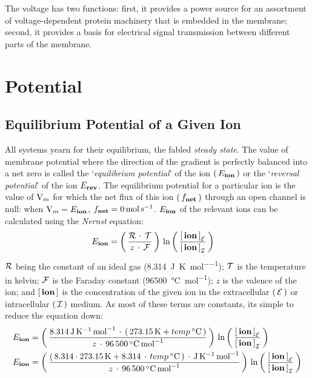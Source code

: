 \documentclass[../../Orator]{subfiles}
\begin{document}
The voltage has two functions: first, it provides a power source for an assortment of voltage-dependent protein machinery that is embedded in the membrane; second, it provides a basis for electrical signal transmission between different parts of the membrane.



\section{Potential}
\subsection{Equilibrium Potential of a Given Ion}
All systems yearn for their equilibrium, the fabled \textit{steady state}. 
The value of membrane potential 
where the direction of the gradient is perfectly balanced into a net zero is  
called the `\textit{equilibrium potential}' of the ion \(\left(\,E_{\mathbf{ion}}\,\right)\) or the `\textit{reversal potential}' of the ion \(E_{\mathbf{rev}}\). The equilibrium potential for a particular 
ion is the value of \(\mathrm{V}_m\) for which the net flux of this ion \(\left(\,f_{\mathbf{net}}\,\right)\) through an open channel is null: when \(\mathrm{V}_m = E_{\mathbf{ion}}\), \(f_{\mathbf{net}} = \qty{0}{\mole\per\second}\).
\(E_{\mathbf{ion}}\) of the relevant ions can be calculated using the \textit{Nernst} equation:
\begin{align}
    E_{\mathbf{ion}} &= \left(\,\frac{\mathcal{R}\, \cdot \,\mathcal{T}}{z\, \cdot \, \mathcal{F}}\,\right) \, \ln \left(\,\frac{\left[\,\mathbf{ion}\,\right]_{\mathcal{E}} }{ \left[\,\mathbf{ion}\,\right]_{\mathcal{I}}} \,\right)  \label{eq:nernst} 
\end{align}
\(\mathcal{R}\) being the constant of an ideal gas (\qty{8.314}{\joule\per\kelvin\per\mol}); \(\mathcal{T}\) is the temperature in kelvin; \(\mathcal{F}\) is the Faraday constant (\qty{96500}{\degreeCelsius\per\mole}); \(z\) is the valence of the ion; and \(\left[\,\mathbf{ion}\,\right]\) is the concentration of the given ion in the extracellular \( \left(\, \mathcal{E} \,\right) \) or intracellular \( \left(\,\mathcal{I}\,\right)\) medium. As most of these terms are constants, its simple to reduce the equation down:
\begin{align*} 
    E_\bfm{ion} &= \br{\frac{ \qty{8.314}{\joule\per\kelvin\per\mol} \, \cdot \, \br{\qty{273.15}{\kelvin} + temp\,\unit{\degreeCelsius}}}{ z\, \cdot \, \qty{96500}{\degreeCelsius\per\mole} }} \,\ln \br{ \frac{\sbr{\bfm{ion}}_\clm{E} }{ \sbr{\bfm{ion}}_\clm{I}} } \\
    E_\bfm{ion} &= \br{\frac{  \br{ 8.314 \cdot \qty{273.15}{\kelvin} + 8.314 \, \cdot \,temp\,\unit{\degreeCelsius}} \, \cdot \, \unit{\joule\per\kelvin\per\mol}  }{ z\, \cdot \, \qty{96500}{\degreeCelsius\per\mole} }} \,\ln \br{ \frac{\sbr{\bfm{ion}}_\clm{E} }{ \sbr{\bfm{ion}}_\clm{I}} } 
\end{align*}
\end{document}
